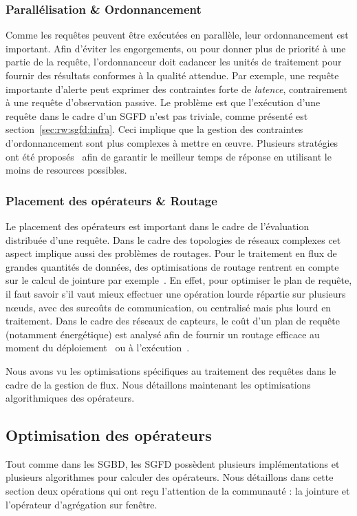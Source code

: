 \subsubsection{Parallélisation \& Ordonnancement}
Comme les requêtes peuvent être exécutées en parallèle, leur ordonnancement est important. Afin d'éviter les engorgements, ou pour donner plus de priorité à une partie de la requête, l'ordonnanceur doit cadancer les unités de traitement pour fournir des résultats conformes à la qualité attendue. Par exemple, une requête importante d'alerte peut exprimer des contraintes forte de \textit{latence}, contrairement à une requête d'observation passive. Le problème est que l'exécution d'une requête dans le cadre d'un SGFD n'est pas triviale, comme présenté est section~\ref{sec:rw:sgfd:infra}. Ceci implique que la gestion des contraintes d'ordonnancement sont plus complexes à mettre en œuvre. Plusieurs stratégies ont été proposés~\cite{Babcock:chain, Jiang:scheduling} afin de garantir le meilleur temps de réponse en utilisant le moins de resources possibles.

\subsubsection{Placement des opérateurs \& Routage}
Le placement des opérateurs est important dans le cadre de l'évaluation distribuée d'une requête. Dans le cadre des topologies de réseaux complexes cet aspect implique aussi des problèmes de routages. Pour le traitement en flux de grandes quantités de données, des optimisations de routage rentrent en compte sur le calcul de jointure par exemple~\cite{Zhou:pmjoin, Palma:p2p}. En effet, pour optimiser le plan de requête, il faut savoir s'il vaut mieux effectuer une opération lourde répartie sur plusieurs nœuds, avec des surcoûts de communication, ou centralisé mais plus lourd en traitement. Dans le cadre des réseaux de capteurs, le coût d'un plan de requête (notamment énergétique) est analysé afin de fournir un routage efficace au moment du déploiement~\cite{Galpin:snee} ou à l'exécution~\cite{Madden:tinydb}.

Nous avons vu les optimisations spécifiques au traitement des requêtes dans le cadre de la gestion de flux. Nous détaillons maintenant les optimisations algorithmiques des opérateurs.

\subsection{Optimisation des opérateurs}
Tout comme dans les SGBD, les SGFD possèdent plusieurs implémentations et plusieurs algorithmes pour calculer des opérateurs. Nous détaillons dans cette section deux opérations qui ont reçu l'attention de la communauté : la jointure et l'opérateur d'agrégation sur fenêtre.

